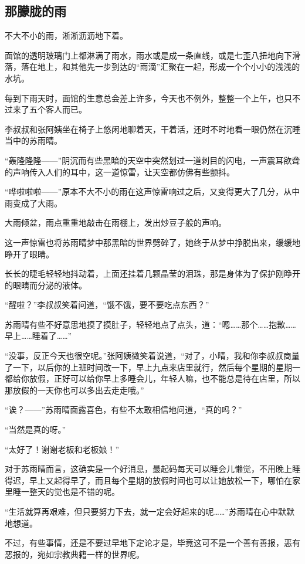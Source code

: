 \subsection{那朦胧的雨}

不大不小的雨，淅淅沥沥地下着。

面馆的透明玻璃门上都淋满了雨水，雨水或是成一条直线，或是七歪八扭地向下滑落，落在地上，和其他先一步到达的“雨滴”汇聚在一起，形成一个个小小的浅浅的水坑。

每到下雨天时，面馆的生意总会差上许多，今天也不例外，整整一个上午，也只不过来了五个客人而已。

李叔叔和张阿姨坐在椅子上悠闲地聊着天，干着活，还时不时地看一眼仍然在沉睡当中的苏雨晴。

“轰隆隆隆——”阴沉而有些黑暗的天空中突然划过一道刺目的闪电，一声震耳欲聋的声响传入人们的耳中，这一道惊雷，让天空都仿佛有些颤抖。

“哗啦啦啦——”原本不大不小的雨在这声惊雷响过之后，又变得更大了几分，从中雨变成了大雨。

大雨倾盆，雨点重重地敲击在雨棚上，发出炒豆子般的声响。

这一声惊雷也将苏雨晴梦中那黑暗的世界劈碎了，她终于从梦中挣脱出来，缓缓地睁开了眼睛。

长长的睫毛轻轻地抖动着，上面还挂着几颗晶莹的泪珠，那是身体为了保护刚睁开的眼睛而分泌的液体。

“醒啦？”李叔叔笑着问道，“饿不饿，要不要吃点东西？”

苏雨晴有些不好意思地摸了摸肚子，轻轻地点了点头，道：“嗯……那个……抱歉……早上……睡着了……”

“没事，反正今天也很空呢。”张阿姨微笑着说道，“对了，小晴，我和你李叔叔商量了一下，以后你的上班时间改一下，早上九点来店里就行，然后每个星期的星期一都给你放假，正好可以给你早上多睡会儿，年轻人嘛，也不能总是待在店里，所以那放假的一天你也可以多出去走走哦。”

“诶？——”苏雨晴面露喜色，有些不太敢相信地问道，“真的吗？”

“当然是真的呀。”

“太好了！谢谢老板和老板娘！”

对于苏雨晴而言，这确实是一个好消息，最起码每天可以睡会儿懒觉，不用晚上睡得迟，早上又起得早了，而且每个星期的放假时间也可以让她放松一下，哪怕在家里睡一整天的觉也是不错的呢。

“生活就算再艰难，但只要努力下去，就一定会好起来的呢……”苏雨晴在心中默默地想道。

不过，有些事情，还是不要过早地下定论才是，毕竟这可不是一个善有善报，恶有恶报的，宛如宗教典籍一样的世界呢。

